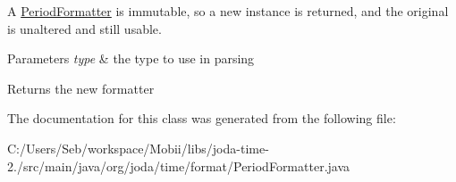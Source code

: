 A \hyperlink{classorg_1_1joda_1_1time_1_1format_1_1_period_formatter}{Period\-Formatter} is immutable, so a new instance is returned, and the original is unaltered and still usable.


\begin{DoxyParams}{Parameters}
{\em type} & the type to use in parsing \\
\hline
\end{DoxyParams}
\begin{DoxyReturn}{Returns}
the new formatter 
\end{DoxyReturn}


The documentation for this class was generated from the following file\-:\begin{DoxyCompactItemize}
\item 
C\-:/\-Users/\-Seb/workspace/\-Mobii/libs/joda-\/time-\/2./src/main/java/org/joda/time/format/Period\-Formatter.\-java\end{DoxyCompactItemize}
